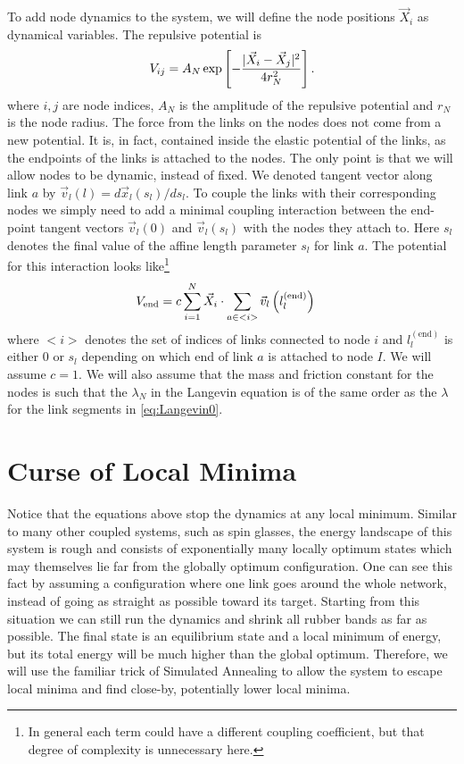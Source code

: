 \documentclass[nofootinbib,preprint,floatfix,titlepage,endfloats,superscriptaddress]{revtex4} %
\begin{document}
To add node dynamics to the system, we will define the node positions $\vec{X}_i$ as dynamical variables. 
The repulsive potential is 
\begin{equation}
V_{ij} = %
A_N \exp\left[- {|\vec{X}_i-\vec{X}_j|^2 \over 4 r_N^2}\right]\label{eq:VIJ0}.
\end{equation}
where $i,j$ are node indices, $A_N$ is the amplitude of the repulsive potential and $r_N$ is the node radius. 
The force from the links on the nodes does  not come from a new potential. 
It is, in fact, contained inside the elastic potential of the links, %
as the endpoints of the links is attached to the nodes. The only point is that we will allow nodes to be dynamic, instead of fixed. We denoted tangent vector along link $a$ by $\vec{v}_l(l) = d\vec{x}_l(s_l)/ds_l $. To couple the links with their corresponding nodes we simply need to add a minimal coupling interaction between the end-point tangent vectors $\vec{v}_l (0)$ and $\vec{v}_l (s_l)$ with the nodes they attach to. Here $s_l$ denotes the final value of the affine length parameter $s_l$ for link $a$. The potential for this interaction looks like\footnote{In general each term could have a different coupling coefficient, but that degree of complexity is unnecessary here.}
\begin{align}
   V_{\mathrm{end}} & =c\sum_{i=1}^N \vec{X}_i \cdot \sum_{a\in <i>}  \vec{v}_l\left(l^{(\mathrm{end})}_l\right)
\end{align}
where $<i>$ denotes the set of indices of links connected to node $i$ and $l^{(\mathrm{end})}_l$ is either $0$ or $s_l$ depending on which end of link $a$ is attached to node $I$. We will assume $c =1$. We will also assume that the mass and friction constant for the nodes is such that the $\lambda_N$ in the Langevin equation is of the same order as the $\lambda$ for the link segments in \eqref{eq:Langevin0}. 

\section{Curse of Local Minima \label{ap:np}}
Notice that the equations above stop the dynamics at any local minimum. 
Similar to many other coupled systems, such as spin glasses\cite{parisi2002physical,pelissetto2002critical}, the energy landscape of this system is rough and consists of exponentially many locally optimum states which may themselves lie far from the globally optimum configuration. One can see this fact by assuming a configuration where one link goes around the whole network, instead of going as  straight as possible toward its target. Starting from this situation we can still run the dynamics and shrink all rubber bands as far as possible. The final state is an equilibrium state and a local minimum of energy, but its total energy will be much higher than the global optimum. Therefore, we will use the familiar trick of Simulated Annealing to allow the system to escape local minima and find close-by, potentially lower local minima.  
\end{document}
